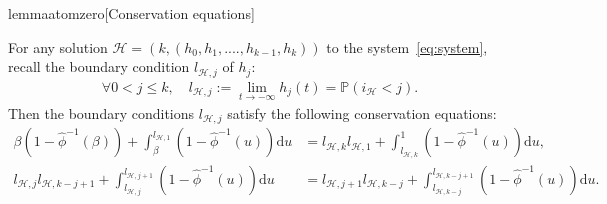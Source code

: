 \documentclass[11pt]{article}
\begin{document}
\begin{restatable}{lemma}{atomzero}[Conservation equations]\label{lem:atomzero}

    For any solution $\mathcal{H}=(k,(h_0,h_{1},....,h_{k-1},h_k))$ to the system~\eqref{eq:system},  recall the boundary condition $l_{\mathcal{H},j}$ of $h_j$:
    \begin{align*}
        \forall 0 < j \leq k, \quad l_{\mathcal{H},j}:= \lim_{t \rightarrow -\infty} h_j(t)=\mathbb{P}(i_\mathcal{H}<j).
    \end{align*}
    Then the boundary conditions $l_{\mathcal{H},j}$ satisfy the following conservation equations:
    \begin{align}
    \beta (1-\hat{\phi}^{-1}(\beta))+\int_{\beta}^{l_{\mathcal{H},1}}(1-\hat{\phi}^{-1}(u))\mathrm{d}u &=l_{\mathcal{H},k}l_{\mathcal{H},1} + \int_{l_{\mathcal{H},k}}^{1}(1-\hat{\phi}^{-1}(u))\mathrm{d}u,\label{eq:atomzerobords} \\
        l_{\mathcal{H},j}l_{\mathcal{H},k-j+1}+ \int_{l_{\mathcal{H},j}}^{l_{\mathcal{H},j+1}}(1-\hat{\phi}^{-1}(u))\mathrm{d}u &= l_{\mathcal{H},j+1}l_{\mathcal{H},k-j} + \int_{l_{\mathcal{H},k-j}}^{l_{\mathcal{H},k-j+1}}(1-\hat{\phi}^{-1}(u))\mathrm{d}u. \label{eq:energysave}
    \end{align}
\end{restatable}
\end{document}
